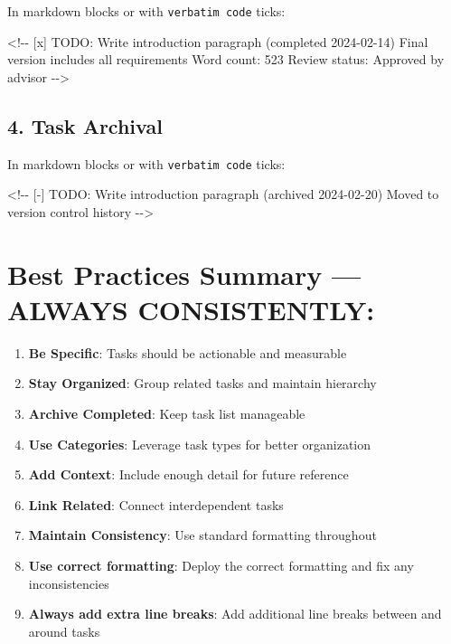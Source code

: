 \documentclass[
  11pt,
  letterpaper,
]{book}
\newenvironment{Shaded}{\begin{snugshade}}{\end{snugshade}}
\newcommand{\AlertTok}[1]{\textcolor[rgb]{0.68,0.00,0.00}{#1}}
\newcommand{\CommentTok}[1]{\textcolor[rgb]{0.37,0.37,0.37}{#1}}
\providecommand{\tightlist}{%
  \setlength{\itemsep}{0pt}\setlength{\parskip}{0pt}}
\begin{document}
In markdown blocks or with \texttt{verbatim\ code} ticks:

\begin{Shaded}
\begin{Highlighting}[]
\CommentTok{\textless{}!{-}{-} [x] }\AlertTok{TODO}\CommentTok{: Write introduction paragraph (completed 2024{-}02{-}14)}
\CommentTok{  Final version includes all requirements}
\CommentTok{  Word count: 523}
\CommentTok{  Review status: Approved by advisor}
\CommentTok{{-}{-}\textgreater{}}
\end{Highlighting}
\end{Shaded}

\subsection*{4. Task Archival}\label{task-archival}

In markdown blocks or with \texttt{verbatim\ code} ticks:

\begin{Shaded}
\begin{Highlighting}[]
\CommentTok{\textless{}!{-}{-} [{-}] }\AlertTok{TODO}\CommentTok{: Write introduction paragraph (archived 2024{-}02{-}20)}
\CommentTok{  Moved to version control history}
\CommentTok{{-}{-}\textgreater{}}
\end{Highlighting}
\end{Shaded}

\section*{Best Practices Summary --- ALWAYS
CONSISTENTLY:}\label{best-practices-summary-always-consistently}


\begin{enumerate}
\def\labelenumi{\arabic{enumi}.}
\tightlist
\item
  \textbf{Be Specific}: Tasks should be actionable and measurable
\item
  \textbf{Stay Organized}: Group related tasks and maintain hierarchy
\item
  \textbf{Archive Completed}: Keep task list manageable
\item
  \textbf{Use Categories}: Leverage task types for better organization
\item
  \textbf{Add Context}: Include enough detail for future reference
\item
  \textbf{Link Related}: Connect interdependent tasks
\item
  \textbf{Maintain Consistency}: Use standard formatting throughout
\item
  \textbf{Use correct formatting}: Deploy the correct formatting and fix
  any inconsistencies
\item
  \textbf{Always add extra line breaks}: Add additional line breaks
  between and around tasks
\end{enumerate}
\end{document}
